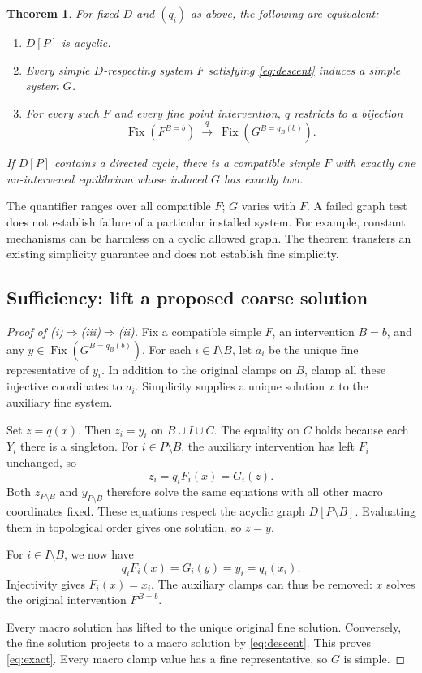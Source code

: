 \documentclass[11pt,a4paper]{article}
\newtheorem{theorem}{Theorem}[section]
\theoremstyle{definition}
\theoremstyle{remark}
\DeclareMathOperator{\Fix}{Fix}
\begin{document}
\begin{theorem}\label{thm:main}
For fixed $D$ and $(q_i)$ as above, the following are equivalent:
\begin{enumerate}[label=(\roman*)]
\item $D[P]$ is acyclic.
\item Every simple $D$-respecting system $F$ satisfying \eqref{eq:descent} induces a simple system $G$.
\item For every such $F$ and every fine point intervention, $q$ restricts to a bijection
\begin{equation}\label{eq:exact}
 \Fix(F^{B=b})\ \xrightarrow{\ q\ }\ \Fix(G^{B=q_B(b)}).
\end{equation}
\end{enumerate}
If $D[P]$ contains a directed cycle, there is a compatible simple $F$ with exactly one un-intervened equilibrium whose induced $G$ has exactly two.
\end{theorem}

The quantifier ranges over all compatible $F$; $G$ varies with $F$. A failed graph test does not establish failure of a particular installed system. For example, constant mechanisms can be harmless on a cyclic allowed graph. The theorem transfers an existing simplicity guarantee and does not establish fine simplicity.

\subsection{Sufficiency: lift a proposed coarse solution}

\begin{proof}[Proof of (i)$\Rightarrow$(iii)$\Rightarrow$(ii)]
Fix a compatible simple $F$, an intervention $B=b$, and any
$y\in\Fix(G^{B=q_B(b)})$. For each $i\in I\setminus B$, let $a_i$ be the unique fine representative of $y_i$. In addition to the original clamps on $B$, clamp all these injective coordinates to $a_i$. Simplicity supplies a unique solution $x$ to the auxiliary fine system.

Set $z=q(x)$. Then $z_i=y_i$ on $B\cup I\cup C$. The equality on $C$ holds because each $Y_i$ there is a singleton. For $i\in P\setminus B$, the auxiliary intervention has left $F_i$ unchanged, so
\[
 z_i=q_iF_i(x)=G_i(z).
\]
Both $z_{P\setminus B}$ and $y_{P\setminus B}$ therefore solve the same equations with all other macro coordinates fixed. These equations respect the acyclic graph $D[P\setminus B]$. Evaluating them in topological order gives one solution, so $z=y$.

For $i\in I\setminus B$, we now have
\[
 q_iF_i(x)=G_i(y)=y_i=q_i(x_i).
\]
Injectivity gives $F_i(x)=x_i$. The auxiliary clamps can thus be removed: $x$ solves the original intervention $F^{B=b}$.

Every macro solution has lifted to the unique original fine solution. Conversely, the fine solution projects to a macro solution by \eqref{eq:descent}. This proves \eqref{eq:exact}. Every macro clamp value has a fine representative, so $G$ is simple.
\end{proof}
\end{document}
